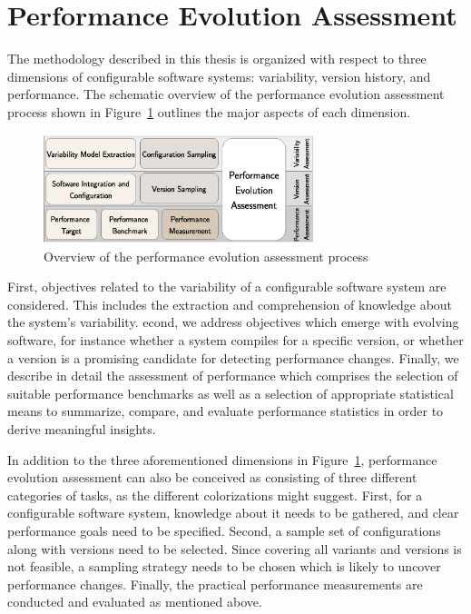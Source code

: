 \section{Performance Evolution Assessment}

The methodology described in this thesis is organized with respect to three
dimensions of configurable software systems: variability, version history, and
performance. The schematic overview of the performance evolution assessment
process shown in Figure~\ref{fig:overview} outlines the major aspects of each
dimension.

\begin{figure}[h!]
	\centering
	\includegraphics[width=0.7\textwidth]{images/process_overview.eps}
	\caption{Overview of the performance evolution assessment process}
	\label{fig:overview}
\end{figure}

First, objectives related to the variability of a configurable software system
are considered. This includes the extraction and comprehension of knowledge
about the system’s variability. econd, we address objectives which emerge with
evolving software, for instance whether a system compiles for a specific
version, or whether a version is a promising candidate for detecting
performance changes. Finally, we describe in detail the assessment of
performance which comprises the selection of suitable performance benchmarks as
well as a selection of appropriate statistical means to summarize, compare, and
evaluate performance statistics in order to derive meaningful insights.

In addition to the three aforementioned dimensions in Figure~\ref{fig:overview},
performance evolution assessment can also be conceived as consisting of three different
categories of tasks, as the different colorizations might suggest. First, for a
configurable software system, knowledge about it needs to be gathered, and
clear performance goals need to be specified. Second, a sample set of
configurations along with versions need to be selected. Since covering all
variants and versions is not feasible, a sampling strategy needs to be chosen
which is likely to uncover performance changes. Finally, the practical
performance measurements are conducted and evaluated as mentioned above.
